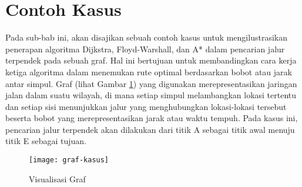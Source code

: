 \section{Contoh Kasus}
Pada sub-bab ini, akan disajikan sebuah contoh kasus untuk mengilustrasikan penerapan algoritma Dijkstra, Floyd-Warshall, dan A* dalam pencarian jalur terpendek pada sebuah graf. Hal ini bertujuan untuk membandingkan cara kerja ketiga algoritma dalam menemukan rute optimal berdasarkan bobot atau jarak antar simpul. Graf (lihat Gambar \ref{fig:grafkasus}) yang digunakan merepresentasikan jaringan jalan dalam suatu wilayah, di mana setiap simpul melambangkan lokasi tertentu dan setiap sisi menunjukkan jalur yang menghubungkan lokasi-lokasi tersebut beserta bobot yang merepresentasikan jarak atau waktu tempuh. Pada kasus ini, pencarian jalur terpendek akan dilakukan dari titik A sebagai titik awal menuju titik E sebagai tujuan.
\begin{figure}[h] 
    \centering  
    \texttt{[image: graf-kasus]}  
    \caption{Visualisasi Graf}
    \label{fig:grafkasus} 
\end{figure}
\newpage

